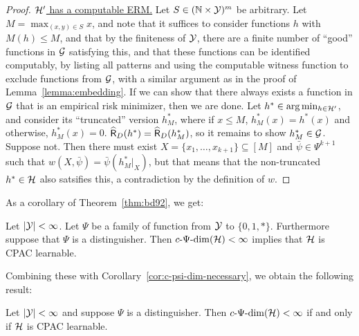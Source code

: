 \documentclass[11pt]{article}
\begin{document}
\begin{proof}
    \underline{$\mathcal{H}'$ has a computable ERM.}
    Let $S\in(\mathbb{N}\times\mathcal{Y})^m$ be arbitrary.
    Let $M=\max_{(x,y)\in S}x$, and note that it suffices to consider functions $h$ with $ M(h)\leq M$, and that by the finiteness of $\mathcal{Y}$, there are a finite number of ``good'' functions in $\mathcal{G}$ satisfying this, and that these functions can be identified computably, by listing all patterns and using the computable witness function to exclude functions from $\mathcal{G}$, with a similar argument as in the proof of Lemma~\ref{lemma:embedding}.
    If we can show that there always exists a function in $\mathcal{G}$ that is an empirical risk minimizer, then we are done.
    Let $h^*\in\arg\min_{h\in\mathcal{H}'}$, and consider its ``truncated'' version $h^*_M$, where if $x\leq M$, $h^*_M(x)=h^*(x)$ and otherwise, $h^*_M(x)=0$.
    $\widehat{\mathsf{R}}_D(h^*)=\widehat{\mathsf{R}}_D(h^*_M)$, so it remains to show $h^*_M\in\mathcal{G}$. 
    Suppose not.
    Then there must exist $X=\{x_1,\dots,x_{k+1}\}\subseteq[M]$ and $\bar{\psi}\in\Psi^{k+1}$ such that $w(X,\bar{\psi})=\bar{\psi}(h^*_M|_X)$, but that means that the non-truncated $h^*\in\mathcal{H}$ also satsifies this, a contradiction by the definition of $w$.
    
\end{proof}

As a corollary of Theorem~\ref{thm:bd92}, we get:

\begin{corollary}
    Let $|\mathcal{Y}|<\infty$.
    Let $\Psi$ be a family of function from $\mathcal{Y}$ to $\{0,1,*\}$.
    Furthermore suppose that $\Psi$ is a distinguisher.
    Then $c\text{-}\Psi\text{-}\mathrm{dim}(\mathcal{H})<\infty$ implies that $\mathcal{H}$ is CPAC learnable.    
\end{corollary}

Combining these with Corollary~\ref{cor:c-psi-dim-necessary}, we obtain the following result:

\begin{theorem}
    \label{thm:cpsidim<infty<->cpac}
  Let $|\mathcal{Y}|<\infty$ and suppose $\Psi$ is a distinguisher. 
    Then $c\text{-}\Psi\text{-}\mathrm{dim}(\mathcal{H})<\infty$ if and only if $\mathcal{H}$ is CPAC learnable.
\end{theorem}

 
\end{document}
